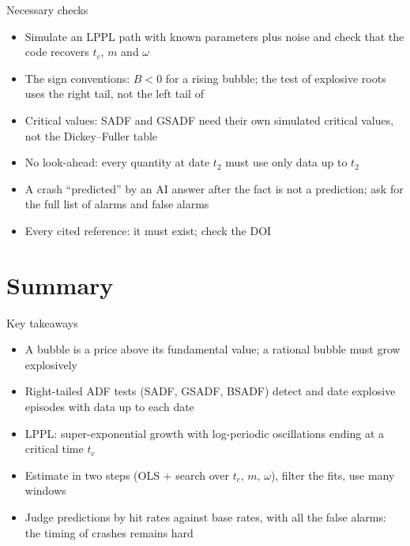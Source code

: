 \begin{frame}{Necessary checks}
\itemsize{\small}
\begin{itemize}
    \item Simulate an LPPL path with known parameters plus noise and check that the code recovers $t_c$, $m$ and $\omega$
    \item The sign conventions: $B < 0$ for a rising bubble; the test of explosive roots uses the right tail, not the left tail of 
    \item Critical values: SADF and GSADF need their own simulated critical values, not the Dickey--Fuller table
    \item No look-ahead: every quantity at date $t_2$ must use only data up to $t_2$
    \item A crash ``predicted'' by an AI answer after the fact is not a prediction; ask for the full list of alarms and false alarms
    \item Every cited reference: it must exist; check the DOI
\end{itemize}
\end{frame}


\section{Summary}

\begin{frame}{Key takeaways}
\itemsize{\small}
\begin{itemize}
    \item A bubble is a price above its fundamental value; a rational bubble must grow explosively
    \item Right-tailed ADF tests (SADF, GSADF, BSADF) detect and date explosive episodes with data up to each date
    \item LPPL: super-exponential growth with log-periodic oscillations ending at a critical time $t_c$
    \item Estimate in two steps (OLS + search over $t_c$, $m$, $\omega$), filter the fits, use many windows
    \item Judge predictions by hit rates against base rates, with all the false alarms: the timing of crashes remains hard
\end{itemize}
\end{frame}

